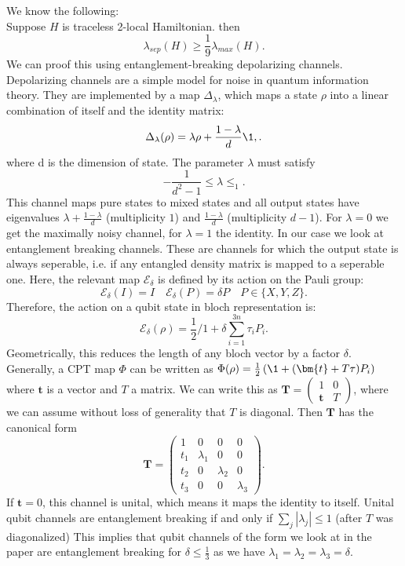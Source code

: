 We know the following: \\
Suppose $H$ is traceless 2-local Hamiltonian. then \[
	\lambda_{sep}(H)\ge \frac{1}{9}\lambda_{max}(H)
.\]
We can proof this using entanglement-breaking depolarizing channels.
Depolarizing channels are a simple model for noise in quantum information theory. \cite{nielsen11}
They are implemented by a map $\Delta_{\lambda}$, which maps a state  $\rho$ into a linear combination of itself and the identity matrix:\cite{king02}\[
	\Delta_{\lambda}(\rho)=\lambda\rho+\frac{1-\lambda}{d}\1,
.\]
where d is the dimension of state. The parameter $\lambda$ must satisfy \[
	-\frac{1}{d^2-1}\le\lambda\le_1
.\]
This channel maps pure states to mixed states and all output states have eigenvalues $\lambda+\frac{1-\lambda}{d}$ (multiplicity $1$) and $\frac{1-\lambda}{d}$ (multiplicity $d-1$).
For $\lambda=0$ we get the maximally noisy channel, for $\lambda=1$ the identity.
In our case we look at entanglement breaking channels.
These are channels for which the output state is always seperable, i.e. if any entangled density matrix is mapped to a seperable one.\cite{horodecki08}
Here, the relevant map $\mathcal{E}_{\delta}$ is defined by its action on the Pauli group: \[
	\mathcal{E}_{\delta}(I)=I\quad\mathcal{E}_{\delta}(P)=\delta P\quad P\in \{X,Y,Z\}
.\]
Therefore, the action on a qubit state in bloch representation is: \[
	\mathcal{E}_{\delta}(\rho) =  \frac{1}{2}/1 + \delta \sum_{i=1}^{3n} \tau_i P_i
.\]
Geometrically, this reduces the length of any bloch vector by a factor $\delta$.
Generally, a CPT  map $\Phi$ can be written as $\Phi(\rho)=\frac{1}{2}\left( \1 + (\bm{t}+T\tau)P_i \right)$ where $\bm{t}$ is a vector and $T$ a matrix.\cite{ruskai03}
We can write this as $\bm{T}=\begin{pmatrix}
	1 & 0 \\
	\bm{t} & T
\end{pmatrix} $, where we can assume without loss of generality that $T$ is diagonal.
Then $\bm{T}$ has the canonical form \[
\bm{T} = \begin{pmatrix}
	1 & 0 & 0 & 0\\
	t_1 & \lambda_1 & 0 & 0\\
	t_2 & 0 & \lambda_2 & 0 \\
	t_3 & 0 & 0 & \lambda_3
\end{pmatrix}
.\]
If $\bm{t}=0$, this channel is unital, which means it maps the identity to itself.
Unital qubit channels are entanglement breaking if and only if $\sum_{j} \left| \lambda_j \right| \le 1$ (after $T$ was diagonalized)\cite{ruskai03}
This implies that qubit channels of the form we look at in the paper are entanglement breaking for $\delta\le \frac{1}{3}$ as we have $\lambda_1=\lambda_2=\lambda_3=\delta$.
